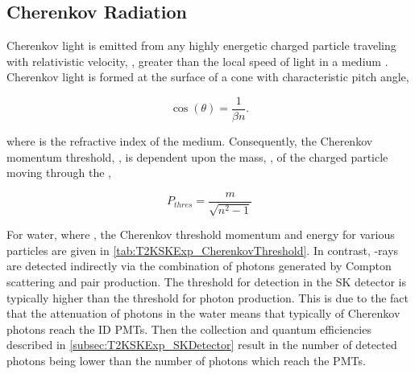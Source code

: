 \subsection{Cherenkov Radiation}
\label{subsec:T2KSKExp_Cherenkov}

Cherenkov light is emitted from any highly energetic charged particle traveling with relativistic velocity, \quickmath{\beta}, greater than the local speed of light in a medium \cite{Cerenkov1937-tl}.
Cherenkov light is formed at the surface of a cone with characteristic pitch angle,

\begin{equation}
  \label{eq:T2KSKExp_CherenkovConeAngle}
  \cos(\theta)=\frac{1}{\beta n}.
\end{equation}

where  is the refractive index of the medium. Consequently, the Cherenkov momentum threshold, , is dependent upon the mass, , of the charged particle moving through the  , 

\begin{equation}
  P_{thres} = \frac{m}{\sqrt{n^{2}-1}}
\end{equation}

For water, where , the Cherenkov threshold momentum and energy for various particles are given in \autoref{tab:T2KSKExp_CherenkovThreshold}. In contrast, \quickmath{\gamma}-rays are detected indirectly via the combination of photons generated by Compton scattering and pair production. The threshold for detection in the SK detector is typically higher than the threshold for photon production. This is due to the fact that the attenuation of photons in the water means that typically  of Cherenkov photons reach the ID PMTs. Then the collection and quantum efficiencies described in \autoref{subsec:T2KSKExp_SKDetector} result in the number of detected photons being lower than the number of photons which reach the PMTs. 

